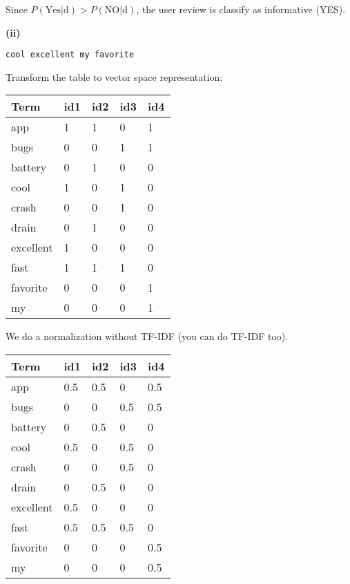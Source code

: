 \documentclass[11pt,a4paper]{report}
\begin{document}
\begin{multicols*}{2}
\noindent Since $P(\text{Yes}|\text{d}) > P(\text{NO}|\text{d})$, the user review is classify as informative (YES).

\noindent \textbf{(ii)}

\begin{center}\verb|cool excellent my favorite|\end{center}

\noindent Transform the table to vector space representation:

\begin{center}
\begin{tabular}{ | l | l l l l |}
    \hline
    Term      & id1 & id2 & id3 & id4 \\ \hline
    app       & 1   & 1   & 0   & 1   \\
    bugs      & 0   & 0   & 1   & 1   \\
    battery   & 0   & 1   & 0   & 0   \\
    cool      & 1   & 0   & 1   & 0   \\
    crash     & 0   & 0   & 1   & 0   \\
    drain     & 0   & 1   & 0   & 0   \\
    excellent & 1   & 0   & 0   & 0   \\
    fast      & 1   & 1   & 1   & 0   \\
    favorite  & 0   & 0   & 0   & 1   \\
    my        & 0   & 0   & 0   & 1   \\
    \hline
\end{tabular}
\end{center}

\noindent We do a normalization without TF-IDF (you can do TF-IDF too).

\begin{center}
\begin{tabular}{ | l | l l l l |}
    \hline
    Term      & id1 & id2 & id3 & id4 \\ \hline
    app       & 0.5 & 0.5 & 0   & 0.5 \\
    bugs      & 0   & 0   & 0.5 & 0.5 \\
    battery   & 0   & 0.5 & 0   & 0   \\
    cool      & 0.5 & 0   & 0.5 & 0   \\
    crash     & 0   & 0   & 0.5 & 0   \\
    drain     & 0   & 0.5 & 0   & 0   \\
    excellent & 0.5 & 0   & 0   & 0   \\
    fast      & 0.5 & 0.5 & 0.5 & 0   \\
    favorite  & 0   & 0   & 0   & 0.5 \\
    my        & 0   & 0   & 0   & 0.5 \\
    \hline
\end{tabular}
\end{center}


\end{multicols*}
\end{document}
